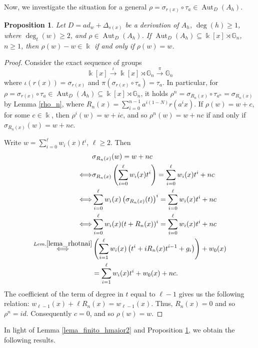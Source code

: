 \documentclass{article}
\numberwithin{equation}{section}\theoremstyle{plain}
\newtheorem{proposition}[theorem]{Proposition}
\DeclareMathOperator{\Aut}{Aut}
\begin{document}
Now, we investigate the situation for a general $\rho=\sigma_{r(x)} \circ \tau_a \in \Aut_D(A_h)$.

\begin{proposition}\label{prop_rhowigualaw}
Let $D=ad_w+\Delta_{s(x)}$ be a derivation of $A_h$, $\deg(h)\geq 1$, where $\deg_{t}(w)\geq 2$, and $\rho \in \Aut_D(A_h)$.
If $\Aut_D(A_h) \subseteq \Bbbk[x] \rtimes \mathbb{G}_n$, $n \geq 1$, then $\rho(w)-w\in \Bbbk$ if and only if $\rho(w) = w$.
\end{proposition}


\begin{proof}
    Consider the exact sequence of groups
    $$\Bbbk[x] \stackrel{\iota}{\longrightarrow} \Bbbk[x] \rtimes \mathbb{G}_{n} \stackrel{\pi}{\longrightarrow} \mathbb{G}_{n}$$
where $\iota(r(x)) = \sigma_{r(x)}$ and $\pi(\sigma_{r(x)} \circ \tau_a) = \tau_a$.
In particular, for $\rho = \sigma_{r(x)} \circ \tau_a \in \Aut_D(A_h) \subseteq \Bbbk[x] \rtimes \mathbb{G}_{n}$, it holds $\rho^n = \sigma_{R_n(x)} \circ \tau_{a^n} = \sigma_{R_n(x)}$ by Lemma \ref{rho_n}, where $R_n(x) = \sum_{i=0}^{n-1} a^{i(1-N)} r(a^i x)$.
If $\rho(w)=w+c$, for some $c \in \Bbbk$, then $\rho^i(w) = w + i c$, and so $ \rho^n(w) =  w + n c$  if and only if $\sigma_{R_n(x)}(w) = w + nc.$

Write $w=\sum_{i=0}^\ell w_i(x) t^i$, $\ell \geq 2$.
Then 
\begin{align*}
& \sigma_{R_n(x)}(w) = w + nc  \\
    \Longleftrightarrow & \sigma_{R_n(x)}\left(\sum_{i=0}^\ell w_i(x) t^i \right) = \sum_{i=0}^\ell w_i(x) t^i + nc \\
\Longleftrightarrow & \sum_{i=0}^\ell w_i(x) \left(\sigma_{R_n(x)}(t)\right)^i = \sum_{i=0}^\ell w_i(x) t^i + nc \\
\Longleftrightarrow & \sum_{i=0}^\ell w_i(x) (t+R_n(x))^i = \sum_{i=0}^\ell w_i(x) t^i + nc \\
\stackrel{Lem. \ref{lema_rhotnai}}{\Longleftrightarrow} & \left(\sum_{i=1}^\ell w_i(x) \left(t^i+iR_n(x)t^{i-1}+g_i \right) \right)  + w_0(x) \\
& = \sum_{i=1}^\ell w_i(x) t^i + w_0(x) + nc.
\end{align*}
The coefficient of the term of degree in $t$ equal to $\ell-1$ gives us the following relation:
$w_{\ell-1}(x) + \ell R_n(x) = w_{\ell -1} (x)$.
Thus, $R_n(x)=0$ and so $\rho^n=id$.
Consequently $c=0$, and so $\rho(w)=w$.
\end{proof}

In light of Lemma \ref{lema_finito_hmaior2} and Proposition \ref{prop_rhowigualaw}, we obtain the following results. 
\end{document}
